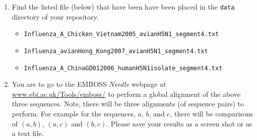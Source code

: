 \begin{enumerate}
	\item Find the listed file (below) that have been have been placed in the {\tt data} directory of your repository.
	
	\begin{itemize}
		\item {\tt Influenza\_A\_Chicken\_Vietnam2005\_avianH5N1\_segment4.txt}
		\item {\tt Influenza\_avianHong\_Kong2007\_avianH5N1\_segment4.txt}
		\item {\tt Influenza\_A\_ChinaGD012006\_humanH5N1isolate\_segment4.txt}
	\end{itemize}

	

    \item You are to go to the EMBOSS \emph{Needle} webpage at \url{www.ebi.ac.uk/Tools/emboss/} to perform a global alignment of the above three sequences. Note, there will be three alignments (of sequence pairs) to perform. For example for the sequences, $a$, $b$, and $c$, there will be comparisons of $(a,b)$, $(a,c)$ and $(b,c)$. Please save your results as a screen shot or as a text file.



\end{enumerate}
